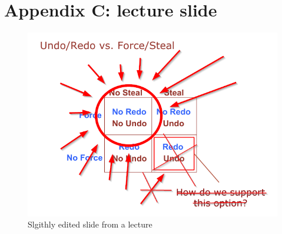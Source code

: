 \documentclass[11pt,a4paper]{article}
\begin{document}
\section{Appendix C: lecture slide}
\begin{figure}[h!]
    \centering
    \includegraphics[scale=0.7]{images/force-nosteal.png}
\caption{Slgithly edited slide from a lecture}
\label{slide}
\end{figure}
\end{document}
